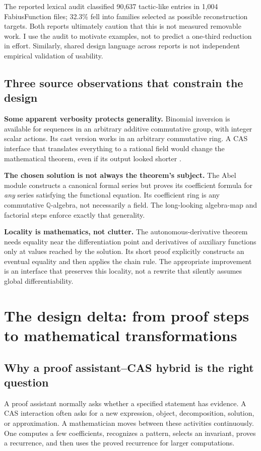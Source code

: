 \documentclass[11pt,letterpaper]{article}
\newcommand{\Q}{\mathbb Q}
\theoremstyle{definition}
\begin{document}
The reported lexical audit classified 90,637 tactic-like entries in 1,004
FabiusFunction files; 32.3\% fell into families selected as possible reconstruction
targets. Both reports ultimately caution that this is not measured removable
work\cite{synthesis,review}. I use the audit to motivate examples, not to predict a
one-third reduction in effort. Similarly, shared design language across reports
is not independent empirical validation of usability.

\subsection{Three source observations that constrain the design}
\textbf{Some apparent verbosity protects generality.}
Binomial inversion is available for sequences in an arbitrary additive commutative
group, with integer scalar actions. Its cast version works in an arbitrary
commutative ring. A CAS interface that translates everything to a rational field
would change the mathematical theorem, even if its output looked shorter
\cite{pbinomial}.

\textbf{The chosen solution is not always the theorem's subject.}
The Abel module constructs a canonical formal series but proves its coefficient
formula for \emph{any} series satisfying the functional equation. Its coefficient
ring is any commutative \(\Q\)-algebra, not necessarily a field. The long-looking
algebra-map and factorial steps enforce exactly that generality\cite{pabel}.

\textbf{Locality is mathematics, not clutter.}
The autonomous-derivative theorem needs equality near the differentiation point
and derivatives of auxiliary functions only at values reached by the solution.
Its short proof explicitly constructs an eventual equality and then applies the
chain rule\cite{pode}. The appropriate improvement is an interface that preserves
this locality, not a rewrite that silently assumes global differentiability.

\section{The design delta: from proof steps to mathematical transformations}\label{sec:delta}
\subsection{Why a proof assistant--CAS hybrid is the right question}
A proof assistant normally asks whether a specified statement has evidence. A CAS
interaction often asks for a new expression, object, decomposition, solution, or
approximation. A mathematician moves between these activities continuously. One
computes a few coefficients, recognizes a pattern, selects an invariant, proves
a recurrence, and then uses the proved recurrence for larger computations.
\end{document}
